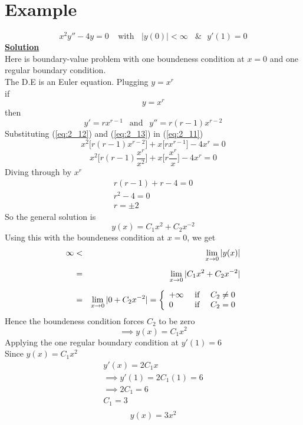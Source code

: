 \documentclass[12pt]{report}
\newcommand{\ubt}[1]{\textbf{\underline{#1}}}
\newcommand{\sps}{\\[0.2cm]}
\newcommand{\refn}[1]{(\ref{#1})}
\newcommand{\refx}[1]{\refn{eq:#1}}
\newcommand{\sprime}{'}
\newcommand{\dprime}{''}
\begin{document}
	\section*{Example}
	\begin{equation}
		x^2y\dprime - 4y = 0 ~~~~~ \text{with}~~~~ |y(0)| < \infty ~~~~\&~~~ y\sprime(1) = 0 \label{eq:2_11}
	\end{equation}
	\ubt{Solution}\sps
	Here is boundary-value problem with one boundeness condition at $x=0$ and one regular boundary condition.\sps
	The D.E is an Euler equation. Plugging $y=x^r$\sps
	if
	\begin{equation}
		y = x^r \label{eq:2_12}
	\end{equation}
	then
	\begin{equation}
		y\sprime = rx^{r-1} ~~\text{ and }~~  y\dprime = r(r-1)x^{r-2}  \label{eq:2_13}
	\end{equation}
	Substituting \refx{2_12} and \refx{2_13} in \refx{2_11}
	$$
		x^2\Big[r(r-1)x^{r-2}\Big] + x\Big[rx^{r-1}\Big] - 4x^r = 0
	$$
	$$
		x^2\Big[r(r-1) \frac{x^r}{x^2}\Big] + x\Big[r\frac{x^r}{x}\Big] - 4x^r = 0
	$$
	Diving through by $x^r$
	\begin{equation*}
		\begin{array}{c}
			r(r-1) + r - 4 = 0\sps
			r^2 - 4 = 0 \sps
			r = \pm 2
		\end{array}
	\end{equation*}
	So the general solution is
	$$
		y(x) = C_1x^2 + C_2x^{-2}
	$$
	Using this with the boundeness condition at $x=0$, we get
	\begin{eqnarray}
		\infty &<& \lim\limits_{x\rightarrow 0}|y(x)|\notag\sps
		&=& \lim\limits_{x\rightarrow 0}|C_1x^2 + C_2x^{-2}|\notag\sps
		&=& \lim\limits_{x\rightarrow 0}|0 + C_2x^{-2}| = \left\{
							\begin{array}{lcl}
								+\infty &\text{ if } & C_2 \neq 0\\
								0 & \text{ if } & C_2 = 0
							\end{array}\right. \notag
	\end{eqnarray}
	Hence the boundeness condition forces $C_2$ to be zero
	$$
		\implies y(x) = C_1x^2
	$$
	Applying the one regular boundary condition at $y'(1) = 6$\sps
	Since $y(x) = C_1x^2$\sps
	\begin{equation*}
		\begin{array}{c}
			y\sprime(x) = 2C_1 x\sps
			\implies y\sprime(1) = 2C_1(1) = 6\sps
			\implies 2C_1 = 6\sps
			C_1 = 3\sps
		\end{array}
	\end{equation*}
	\begin{equation*}
		y(x) = 3x^2
	\end{equation*}
	
\end{document}

